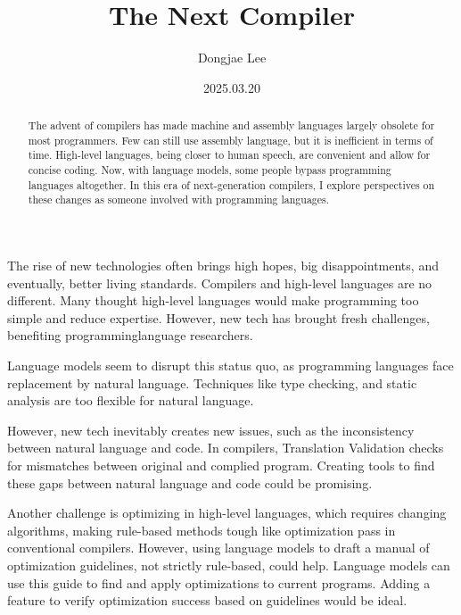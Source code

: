\documentclass[11pt, oneside]{article}   	%
\title{The Next Compiler}
\author{Dongjae Lee}
\date{2025.03.20}
\begin{document}
\maketitle


\begin{abstract}
	The advent of compilers has made machine and assembly languages largely obsolete for most programmers. Few can still use assembly language, but it is inefficient in terms of time. High-level languages, being closer to human speech, are convenient and allow for concise coding. Now, with language models, some people bypass programming languages altogether. In this era of next-generation compilers, I explore perspectives on these changes as someone involved with programming languages.
\end{abstract}
The rise of new technologies often brings high hopes, big disappointments, and eventually, better living standards. Compilers and high-level languages are no different. Many thought high-level languages would make programming too simple and reduce expertise. However, new tech has brought fresh challenges, benefiting programminglanguage researchers.

Language models seem to disrupt this status quo, as programming languages face replacement by natural language. Techniques like type checking, and static analysis are too flexible for natural language.

However, new tech inevitably creates new issues, such as the inconsistency between natural language and code. In compilers, Translation Validation checks for mismatches between original and complied program. Creating tools to find these gaps between natural language and code could be promising.

Another challenge is optimizing in high-level languages, which requires changing algorithms, making rule-based methods tough like optimization pass in conventional compilers. However, using language models to draft a manual of optimization guidelines, not strictly rule-based, could help. Language models can use this guide to find and apply optimizations to current programs. Adding a feature to verify optimization success based on guidelines would be ideal.
\end{document}
